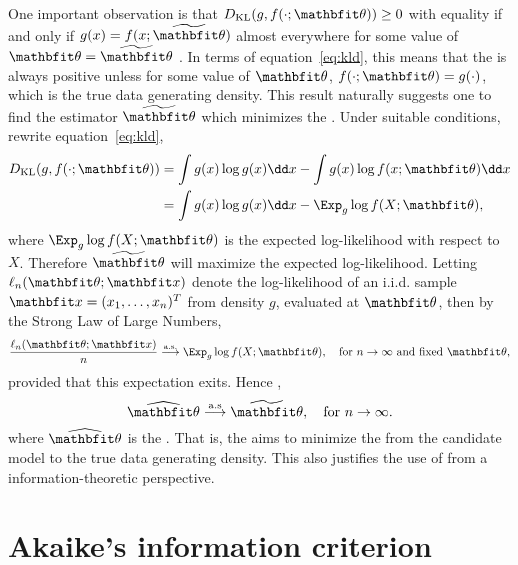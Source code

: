One important observation is that $\dkl(g,f(\cdot;\bth))\ge0$ with equality if
and only if $g(x) = f(x;\tbth)$ almost everywhere for some value of $\bth =
\tbth$ \parencite{Kullback1951}. In terms of equation~\eqref{eq:kld}, this
means that the \kl is always positive unless for some value of $\bth$,
$f(\cdot;\bth) = g(\cdot)$, which is the true data generating density. This
result naturally suggests one to find the estimator $\tbth$ which minimizes
the \kl. Under suitable conditions, rewrite equation~\eqref{eq:kld},
\begin{align}
  \dkl(g,f(\cdot;\bth))
  & = \int g(x)\log g(x)\dd x - \int g(x)\log f(x;\bth)\dd x \notag\\
  & = \int g(x)\log g(x)\dd x - \Exp_g \log f(X;\bth),
  \label{eq:kl exp ll}
\end{align}
where $\Exp_g\log f(X;\bth)$ is the expected log-likelihood with respect to
$X$. Therefore $\tbth$ will maximize the expected log-likelihood. Letting
$\ell_n(\bth;\bfx)$ denote the log-likelihood of an i.i.d. sample $\bfx =
(x_1,\dots,x_n)^T$ from density $g$, evaluated at $\bth$, then by the Strong
Law of Large Numbers,
\begin{equation}
  \frac{\ell_n(\bth;\bfx)}{n}
  \overset{\mathrm{a.s.}}{\longrightarrow}
  \Exp_g\log f(X;\bth), \quad\text{for } n\to\infty\text{ and fixed }\bth,
  \label{eq:kl consistency}
\end{equation}
provided that this expectation exits. Hence \parencite[see][for
details]{Kullback1951},
\begin{equation}
  \hbth \overset{\mathrm{a.s}}{\longrightarrow} \tbth,
  \quad\text{for } n\to\infty.
\end{equation}
where $\hbth$ is the \mle. That is, the \mle aims to minimize the \kl from the
candidate model to the true data generating density. This also justifies the
use of \mle from a information-theoretic perspective.

\section{Akaike's information criterion}
\label{sec:Akaike's information criterion}

